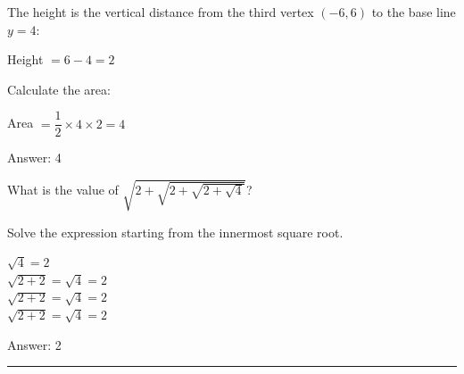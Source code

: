 \documentclass[11pt,paper=a4,answers]{exam}
\begin{document}
\begin{questions}
\begin{solution}
The height is the vertical distance from the third vertex $(-6, 6)$ to the base line $y=4$:
\begin{center}
Height $= 6 - 4 = 2$
\end{center}
\vspace{5pt}

Calculate the area:
\begin{center}
Area $= \dfrac{1}{2} \times 4 \times 2 = 4$
\end{center}

Answer: \colorbox{yellow!100}{4}
\end{solution}

\vspace{1cm}

\question
What is the value of $\sqrt{2 + \sqrt{2 + \sqrt{2 + \sqrt{4}}}}$?

\begin{solution}
Solve the expression starting from the innermost square root.
\vspace{5pt}

\begin{center}
$\sqrt{4} = 2$ \\
$\sqrt{2 + 2} = \sqrt{4} = 2$ \\
$\sqrt{2 + 2} = \sqrt{4} = 2$ \\
$\sqrt{2 + 2} = \sqrt{4} = 2$
\end{center}

Answer: \colorbox{yellow!100}{2}
\end{solution}

\end{questions}

\begin{center}
\rule{.5\textwidth}{1pt}
\end{center}
\end{document}
